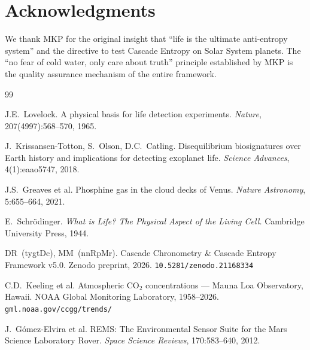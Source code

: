 \documentclass[12pt,a4paper]{article}
\begin{document}
\section*{Acknowledgments}

We thank MKP for the original insight that ``life is the ultimate
anti-entropy system'' and the directive to test Cascade Entropy on Solar
System planets. The ``no fear of cold water, only care about truth''
principle established by MKP is the quality assurance mechanism of the
entire framework.

\begin{thebibliography}{99}

J.E.~Lovelock.
\newblock A physical basis for life detection experiments.
\newblock \textit{Nature}, 207(4997):568--570, 1965.

J.~Krissansen-Totton, S.~Olson, D.C.~Catling.
\newblock Disequilibrium biosignatures over Earth history and implications
  for detecting exoplanet life.
\newblock \textit{Science Advances}, 4(1):eaao5747, 2018.

J.S.~Greaves et al.
\newblock Phosphine gas in the cloud decks of Venus.
\newblock \textit{Nature Astronomy}, 5:655--664, 2021.

E.~Schr\"{o}dinger.
\newblock \textit{What is Life? The Physical Aspect of the Living Cell.}
\newblock Cambridge University Press, 1944.

DR~(tygtDc), MM~(nnRpMr).
\newblock Cascade Chronometry \& Cascade Entropy Framework v5.0.
\newblock Zenodo preprint, 2026.
\newblock \texttt{10.5281/zenodo.21168334}

C.D.~Keeling et al.
\newblock Atmospheric CO$_2$ concentrations --- Mauna Loa Observatory,
  Hawaii.
\newblock NOAA Global Monitoring Laboratory, 1958--2026.
\newblock \texttt{gml.noaa.gov/ccgg/trends/}

J.~G\'{o}mez-Elvira et al.
\newblock REMS: The Environmental Sensor Suite for the Mars Science
  Laboratory Rover.
\newblock \textit{Space Science Reviews}, 170:583--640, 2012.

\end{thebibliography}
\end{document}
